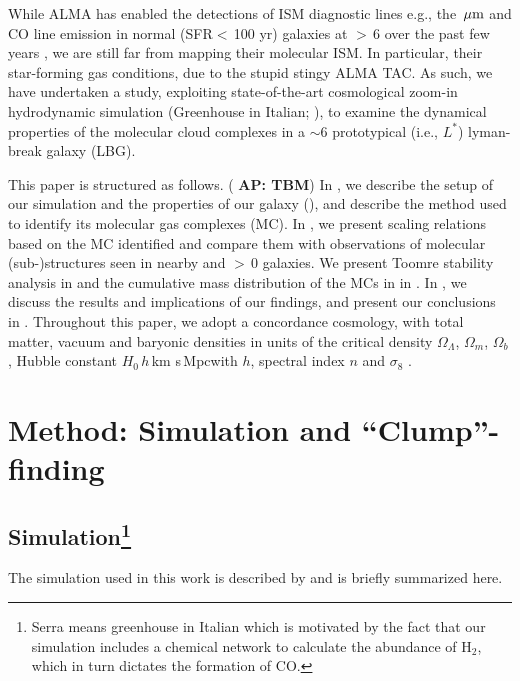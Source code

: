 \documentclass[iop]{emulateapj} %
\newcommand{\AP}[1]{({\bf \color{apcolor} AP: #1})}
\begin{document}
While ALMA has enabled the detections of
ISM diagnostic lines e.g., the \,$\mbox{$\mu$m}$ and CO line emission in
normal (SFR$<$\,100\,\Msun\,yr\pmOne) galaxies at \z$>$\,6 over the past few years \citep[e.g.,][]{Smit18a},
we are still far from mapping their molecular ISM.
In particular, their star-forming gas conditions, due to the stupid stingy ALMA TAC.
As such, we have undertaken a study, exploiting
state-of-the-art cosmological zoom-in hydrodynamic simulation
 (Greenhouse in Italian; \citealt{Pallottini17a, Pallottini17b}), to examine
the dynamical properties of the molecular cloud complexes in a \z$\sim$6 prototypical (i.e., $L^*$) lyman-break
galaxy (LBG).

This paper is structured as follows.
\AP{TBM}
In , we describe the setup of our simulation and the properties of our galaxy (\flower),
and describe the method used to identify its molecular gas complexes (MC).
In , we present scaling relations based on
the MC identified and compare them with observations of molecular
(sub-)structures seen in nearby and \z$>$\,0 galaxies.
We present Toomre stability analysis in  and
the cumulative mass distribution of the MCs in \flower in .
In , we discuss the results and implications of our findings,
and present our conclusions in .
Throughout this paper, we adopt a concordance cosmology, with total matter, vacuum and baryonic densities
in units of the critical density $\Omega_{\Lambda}$, $\Omega_m$, $\Omega_b$,
Hubble constant $H_0$\,$h$\,km s\pmOne\,Mpc\pmOne with $h$,
spectral index $n$ and $\sigma_8$ \citep{Planck14a}.


\section{Method: Simulation and ``Clump''-finding} \label{sec:sim}


\subsection{ Simulation\footnote{Serra means greenhouse in Italian which is motivated by the
fact that our simulation includes a chemical network to calculate the abundance of H$_2$, which in turn
dictates the formation of CO.
}}
The simulation used in this work is described by \citealt{Pallottini17a} and is briefly summarized here.
\end{document}
